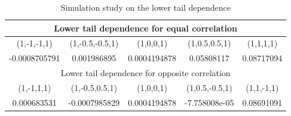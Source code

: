 \documentclass[mstat,12pt]{unswthesis}  %
\numberwithin{equation}{section}
\begin{document}
\begin{table}[H]
\centering
\begin{tabular}{|c|c|c|c|c|}
\hline
\multicolumn{5}{|c|}{Lower tail dependence for equal correlation}            \\ \hline
(1,-1,-1,1)   & (1,-0.5,-0.5,1) & (1,0,0,1)    & (1,0.5,0.5,1)  & (1,1,1,1)  \\ \hline
-0.0008705791 & 0.001986895     & 0.0004194878 & 0.05808117     & 0.08717094 \\ \hline
\multicolumn{5}{|c|}{Lower tail dependence for opposite correlation}         \\ \hline
(1,-1,1,1)    & (1,-0.5,0.5,1)  & (1,0,0,1)    & (1,0.5,-0.5,1) & (1,1,-1,1) \\ \hline
0.000683531   & -0.0007985829   & 0.0004194878 & -7.758008e-05  & 0.08691091 \\ \hline
\end{tabular}
\caption{Simulation study on the lower tail dependence }
\label{tab:my-table}
\end{table}
\end{document}
